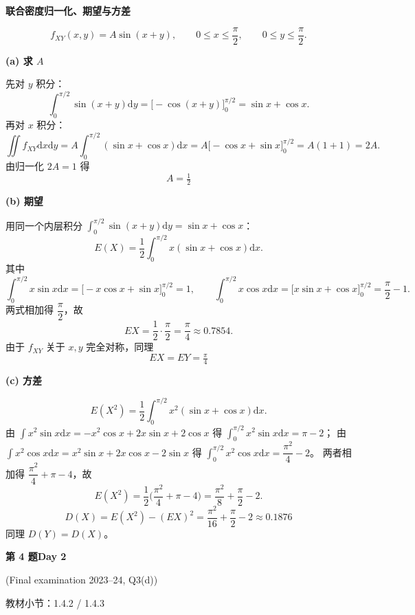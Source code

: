 \documentclass[10.5pt,fontset=fandol]{ctexart}
\newcommand{\key}[1]{\par\vspace{4pt}\noindent\textbf{\color{navy}#1}\par\vspace{2pt}}
\newcommand{\dd}{\mathrm d}\newcommand{\Var}{\operatorname{Var}}\newcommand{\Cov}{\operatorname{Cov}}
\newcommand{\qtitle}[2]{\par\addvspace{1.2em}\Needspace{8\baselineskip}\begin{tcolorbox}[colback=navy,colframe=navy,arc=1.5pt,boxrule=0pt]\color{white}\large\bfseries #1\hfill\small #2\end{tcolorbox}}
\begin{document}
\noindent\textbf{联合密度归一化、期望与方差}\par\smallskip\begin{tcolorbox}[breakable,colback=qbg,colframe=qbg,boxrule=0pt]\[
f_{XY}(x,y)=A\sin(x+y),\qquad 0\le x\le \frac{\pi}{2},\qquad 0\le y\le\frac{\pi}{2}.
\]

\key{(a) 求 $A$}
先对 $y$ 积分：
\[
\int_0^{\pi/2}\sin(x+y)\dd y=\big[-\cos(x+y)\big]_0^{\pi/2}=\sin x+\cos x .
\]
再对 $x$ 积分：
\[
\iint f_{XY}\dd x\dd y=A\int_0^{\pi/2}(\sin x+\cos x)\dd x
=A\big[-\cos x+\sin x\big]_0^{\pi/2}=A(1+1)=2A .
\]
由归一化 $2A=1$ 得
\[
\boxed{A=\tfrac12}
\]

\key{(b) 期望}
用同一个内层积分 $\int_0^{\pi/2}\sin(x+y)\dd y=\sin x+\cos x$：
\[
E(X)=\frac12\int_0^{\pi/2}x(\sin x+\cos x)\dd x .
\]
其中
\[
\int_0^{\pi/2}x\sin x\dd x=\big[-x\cos x+\sin x\big]_0^{\pi/2}=1,
\qquad
\int_0^{\pi/2}x\cos x\dd x=\big[x\sin x+\cos x\big]_0^{\pi/2}=\frac{\pi}{2}-1 .
\]
两式相加得 $\dfrac{\pi}{2}$，故
\[
EX=\frac12\cdot\frac{\pi}{2}=\frac{\pi}{4}\approx0.7854 .
\]
由于 $f_{XY}$ 关于 $x,y$ 完全对称，同理
\[
\boxed{EX=EY=\tfrac{\pi}{4}}
\]

\key{(c) 方差}
\[
E(X^2)=\frac12\int_0^{\pi/2}x^2(\sin x+\cos x)\dd x .
\]
由 $\int x^2\sin x\dd x=-x^2\cos x+2x\sin x+2\cos x$ 得 $\int_0^{\pi/2}x^2\sin x\dd x=\pi-2$；
由 $\int x^2\cos x\dd x=x^2\sin x+2x\cos x-2\sin x$ 得 $\int_0^{\pi/2}x^2\cos x\dd x=\dfrac{\pi^2}{4}-2$。
两者相加得 $\dfrac{\pi^2}{4}+\pi-4$，故
\[
E(X^2)=\frac12\Big(\frac{\pi^2}{4}+\pi-4\Big)=\frac{\pi^2}{8}+\frac{\pi}{2}-2 .
\]
\[
\boxed{D(X)=E(X^2)-(EX)^2=\frac{\pi^2}{16}+\frac{\pi}{2}-2\approx0.1876}
\]
同理 $D(Y)=D(X)$。
\end{tcolorbox}
\qtitle{第 4 题}{Day 2}
{\small\color{accentred}(Final examination 2023--24, Q3(d))}\par\smallskip
{\small\color{muted}教材小节：1.4.2 / 1.4.3}\par\medskip
\end{document}
